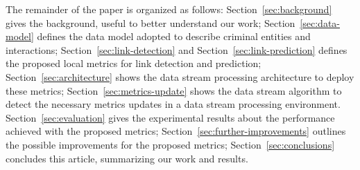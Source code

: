 
The remainder of the paper is organized as follows:
Section~\ref{sec:background} gives the background, useful to better understand our work;
Section~\ref{sec:data-model} defines the data model adopted to describe criminal entities and interactions;
Section~\ref{sec:link-detection} and Section~\ref{sec:link-prediction} defines the proposed local metrics for link detection and prediction;
Section~\ref{sec:architecture} shows the data stream processing architecture to deploy these metrics;
Section~\ref{sec:metrics-update} shows the data stream algorithm to detect the necessary metrics updates in a data stream processing environment.
Section~\ref{sec:evaluation} gives the experimental results about the performance achieved with the proposed metrics;
Section~\ref{sec:further-improvements} outlines the possible improvements for the proposed metrics;
Section~\ref{sec:conclusions} concludes this article, summarizing our work and results.
